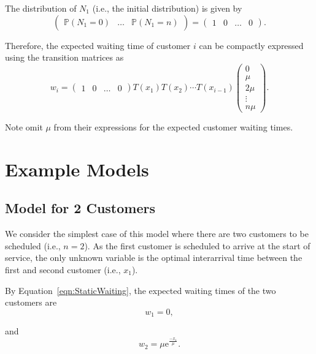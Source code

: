 The distribution of $N_{1}$ (i.e., the initial distribution) is given by
\begin{equation}
	\left( \begin{array}{ccc} \mathbb{P} (N_{1} = 0) & \ldots & \mathbb{P} (N_{1} = n) \end{array} \right) = \left( \begin{array}{cccc} 1 & 0 & \ldots & 0 \end{array} \right).
\end{equation}

Therefore, the expected waiting time of customer $i$ can be compactly expressed using the transition matrices as
\begin{equation}
	w_{i}
	= \left( \begin{array}{cccc} 1 & 0 & \ldots & 0 \end{array} \right)
	T (x_{1}) T (x_{2}) \cdots T (x_{i - 1})
	\left( \begin{array}{c} 0 \\ \mu \\ 2 \mu \\ \vdots \\ n \mu \end{array} \right).
	\label{eqn:StaticWaiting}
\end{equation}

Note \citet{Stein} omit $\mu$ from their expressions for the expected customer waiting times.

\section{Example Models}
\subsection{Model for 2 Customers}
\label{sec:StaticTwoCust}
We consider the simplest case of this model where there are two customers to be scheduled (i.e., $n = 2$). As the first customer is scheduled to arrive at the start of service, the only unknown variable is the optimal interarrival time between the first and second customer (i.e., $x_{1}$).

By Equation~\ref{eqn:StaticWaiting}, the expected waiting times of the two customers are
\begin{equation}
	w_{1} = 0,
\end{equation}

and
\begin{equation}
	w_{2} = \mu \mathrm{e}^{\frac{- x_{1}}{\mu}}.
\end{equation}

